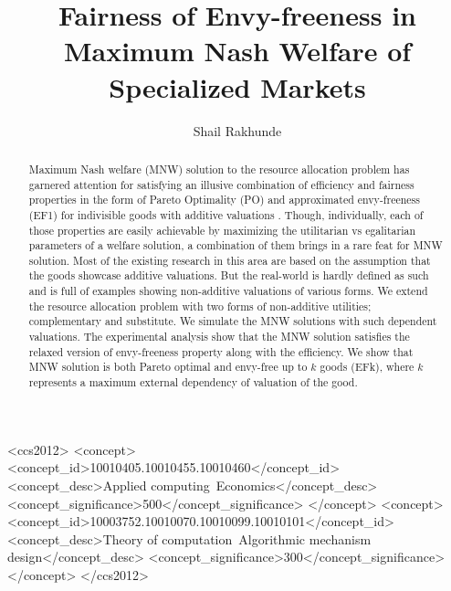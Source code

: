 \documentclass[sigconf]{acmart}
\theoremstyle{plain}
\theoremstyle{definition}
\begin{document}
\title{Fairness of Envy-freeness in Maximum Nash Welfare of Specialized Markets}


\author{Shail Rakhunde}


\begin{abstract}
\label{section_abstract}

Maximum Nash welfare (MNW) solution to the resource allocation problem has garnered attention for satisfying an illusive combination of efficiency and fairness properties in the form of Pareto Optimality (PO) and approximated envy-freeness (EF1) for indivisible goods with additive valuations \cite{caragiannis2016unreasonable}. Though, individually, each of those properties are easily achievable by maximizing the utilitarian vs egalitarian parameters of a welfare solution, a combination of them brings in a rare feat for MNW solution. Most of the existing research in this area are based on the assumption that the goods showcase additive valuations. But the real-world is hardly defined as such and is full of examples showing non-additive valuations of various forms. We extend the resource allocation problem with two forms of non-additive utilities; complementary and substitute. We simulate the MNW solutions with such dependent valuations. The experimental analysis show that the MNW solution satisfies the relaxed version of envy-freeness property along with the efficiency.  We show that MNW solution is both Pareto optimal and envy-free up to $k$ goods (EFk), where $k$ represents a maximum external dependency of valuation of the good.

\end{abstract}

%
%
\begin{CCSXML}
<ccs2012>
<concept>
<concept_id>10010405.10010455.10010460</concept_id>
<concept_desc>Applied computing~Economics</concept_desc>
<concept_significance>500</concept_significance>
</concept>
<concept>
<concept_id>10003752.10010070.10010099.10010101</concept_id>
<concept_desc>Theory of computation~Algorithmic mechanism design</concept_desc>
<concept_significance>300</concept_significance>
</concept>
</ccs2012>
\end{CCSXML}



\maketitle





\end{document}
